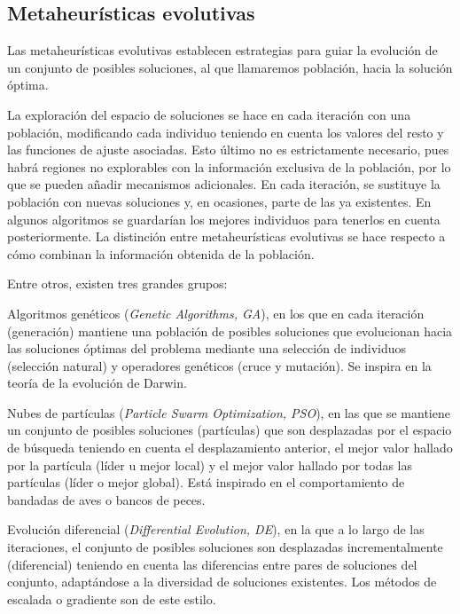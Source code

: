 \subsection{Metaheurísticas evolutivas}
Las metaheurísticas evolutivas establecen estrategias para guiar la evolución de un conjunto de posibles soluciones, al que llamaremos población, hacia la solución óptima.

La exploración del espacio de soluciones se hace en cada iteración con una población, modificando cada individuo teniendo en cuenta los valores del resto y las funciones de ajuste asociadas. Esto último no es estrictamente necesario, pues habrá regiones no explorables con la información exclusiva de la población, por lo que se pueden añadir mecanismos adicionales. En cada iteración, se sustituye la población con nuevas soluciones y, en ocasiones, parte de las ya existentes. En algunos algoritmos se guardarían los mejores individuos para tenerlos en cuenta posteriormente. La distinción entre metaheurísticas evolutivas se hace respecto a cómo combinan la información obtenida de la población.

Entre otros, existen tres grandes grupos:

Algoritmos genéticos (\textit{Genetic Algorithms, GA}), en los que en cada iteración (generación) mantiene una población de posibles soluciones que evolucionan hacia las soluciones óptimas del problema mediante una selección de individuos (selección natural) y operadores genéticos (cruce y mutación). Se inspira en la teoría de la evolución de Darwin.

Nubes de partículas (\textit{Particle Swarm Optimization, PSO}), en las que se mantiene un conjunto de posibles soluciones (partículas) que son desplazadas por el espacio de búsqueda teniendo en cuenta el desplazamiento anterior, el mejor valor hallado por la partícula (líder u mejor local) y el mejor valor hallado por todas las partículas (líder o mejor global). Está inspirado en el comportamiento de bandadas de aves o bancos de peces.

Evolución diferencial (\textit{Differential Evolution, DE}), en la que a lo largo de las iteraciones, el conjunto de posibles soluciones son desplazadas incrementalmente (diferencial) teniendo en cuenta las diferencias entre pares de soluciones del conjunto, adaptándose a la diversidad de soluciones existentes. Los métodos de escalada o gradiente son de este estilo.





